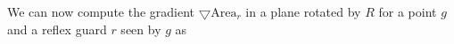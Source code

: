 





We can now compute the gradient $\bigtriangledown \text{Area}_r$ in a plane rotated by $R$ for a point $g$ and a reflex guard $r$ seen by $g$ as

